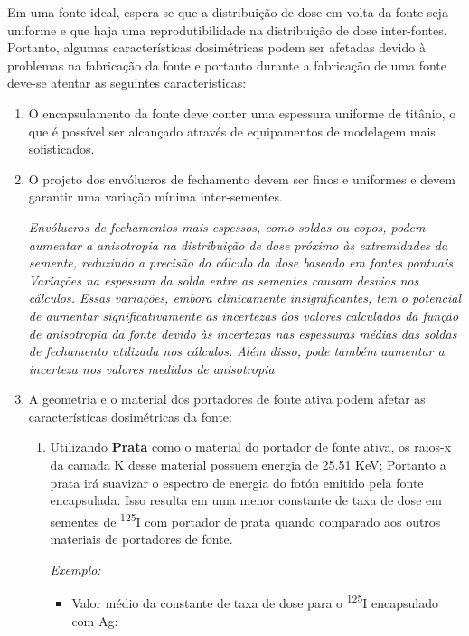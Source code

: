 \documentclass[11pt,a4paper]{article}
\begin{document}
			Em uma fonte ideal, espera-se que a distribuição de dose em volta da fonte seja uniforme e que haja uma reprodutibilidade na distribuição de dose inter-fontes. Portanto, algumas características dosimétricas podem ser afetadas devido à problemas na fabricação da fonte e portanto durante a fabricação de uma fonte deve-se atentar as seguintes características:

				\begin{enumerate}
					\item O encapsulamento da fonte deve conter uma espessura uniforme de titânio, o que é possível ser alcançado através de equipamentos de modelagem mais sofisticados.
					
					\item O projeto dos envólucros de fechamento devem ser finos e uniformes e devem garantir uma variação mínima inter-sementes. 

						\textit{Envólucros de fechamentos mais espessos, como soldas ou copos, podem aumentar a anisotropia na distribuição de dose próximo às extremidades da semente, reduzindo a precisão do cálculo da dose baseado em fontes pontuais. Variações na espessura da solda entre as sementes causam desvios nos cálculos. Essas variações, embora clinicamente insignificantes, tem o potencial de aumentar significativamente as incertezas dos valores calculados da função de anisotropia da fonte devido às incertezas nas espessuras médias das soldas de fechamento utilizada nos cálculos. Além disso, pode também aumentar a incerteza nos valores medidos de anisotropia}
					
					\item A geometria e o material dos portadores de fonte ativa podem afetar as características dosimétricas da fonte:
					
						\begin{enumerate}
							\item Utilizando \textbf{Prata} como o material do portador de fonte ativa, os raios-x da camada K desse material possuem energia de 25.51 KeV; Portanto a prata irá suavizar o espectro de energia do fotón emitido pela fonte encapsulada. Isso resulta em uma menor constante de taxa de dose em sementes de \textsuperscript{125}I com portador de prata quando comparado aos outros materiais de portadores de fonte.
							
								\textit{\textcolor{CarnationPink}{Exemplo:}} 
									\begin{itemize}
										\item Valor médio da constante de taxa de dose para o \textsuperscript{125}I encapsulado com Ag:
										

\end{itemize}
\end{enumerate}
\end{enumerate}
\end{document}
